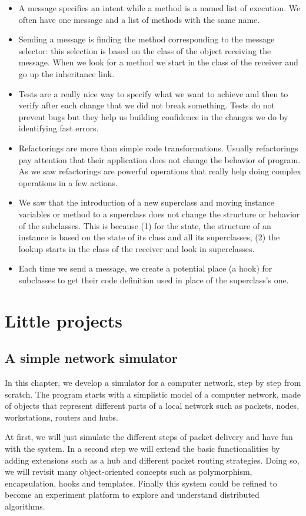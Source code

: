 \documentclass[10pt,twoside,english]{_support/latex/sbabook/sbabook}
\begin{document}
\begin{itemize}
\item A message specifies an intent while a method is a named list of execution. We often have one message and a list of methods with the same name. 
\item Sending a message is finding the method corresponding to the message selector: this selection is based on the class of the object receiving the message. When we look for a method we start in the class of the receiver and go up the inheritance link. 
\item Tests are a really nice way to specify what we want to achieve and then to verify after each change that we did not break something. Tests do not prevent bugs but they help us building confidence in the changes we do by identifying fast errors. 
\item Refactorings are more than simple code transformations. Usually refactorings pay attention that their application does not change the behavior of program. As we saw refactorings are powerful operations that really help doing complex operations in a few actions. 
\item We saw that the introduction of a new superclass and moving instance variables or method to a superclass does not change the structure or behavior of the subclasses. This is because (1) for the state, the structure of an instance is based on the state of its class and all its superclasses, (2) the lookup starts in the class of the receiver and look in superclasses. 
\item Each time we send a message, we create a potential place (a hook) for subclasses to get their code definition used in place of the superclass's one.
\end{itemize}

\part{Little projects}
\chapter{A simple network simulator }\label{ch:lan}
In this chapter, we develop a simulator for a computer network, step by step from scratch.
The program starts with a simplistic model of a computer network, made of objects that represent different parts of a local network such as packets, nodes, workstations, routers and hubs.

At first, we will just simulate the different steps of packet delivery and have fun with the system.
In a second step we will extend the basic functionalities by adding extensions such as a hub and different packet routing strategies.
Doing so, we will revisit many object-oriented concepts such as polymorphism, encapsulation, hooks and templates.
Finally this system could be refined to become an experiment platform to explore and understand distributed algorithms.
\end{document}
